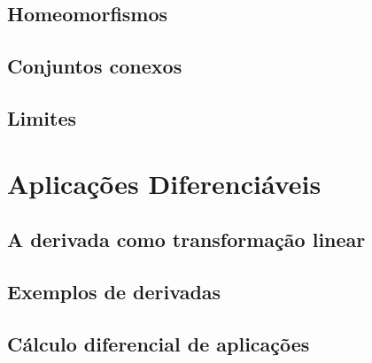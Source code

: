 \documentclass{article}
\begin{document}
\subsection{Homeomorfismos}
\subsection{Conjuntos conexos}
\subsection{Limites}

\section{Aplicações Diferenciáveis}
\subsection{A derivada como transformação linear}
\subsection{Exemplos de derivadas}
\subsection{Cálculo diferencial de aplicações}
\end{document}
